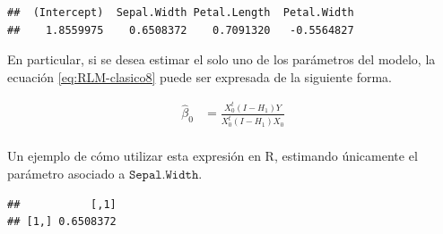 \documentclass[
  11pt,
]{book}
\newenvironment{Shaded}{\begin{snugshade}}{\end{snugshade}}
\newcommand{\AttributeTok}[1]{\textcolor[rgb]{0.13,0.29,0.53}{#1}}
\newcommand{\CommentTok}[1]{\textcolor[rgb]{0.56,0.35,0.01}{\textit{#1}}}
\newcommand{\DecValTok}[1]{\textcolor[rgb]{0.00,0.00,0.81}{#1}}
\newcommand{\FunctionTok}[1]{\textcolor[rgb]{0.13,0.29,0.53}{\textbf{#1}}}
\newcommand{\NormalTok}[1]{#1}
\newcommand{\OtherTok}[1]{\textcolor[rgb]{0.56,0.35,0.01}{#1}}
\newcommand{\SpecialCharTok}[1]{\textcolor[rgb]{0.81,0.36,0.00}{\textbf{#1}}}
\theoremstyle{definition}
\theoremstyle{definition}
\theoremstyle{definition}
\theoremstyle{definition}
\theoremstyle{remark}
\begin{document}
\begin{verbatim}
##  (Intercept)  Sepal.Width Petal.Length  Petal.Width 
##    1.8559975    0.6508372    0.7091320   -0.5564827
\end{verbatim}

En particular, si se desea estimar el solo uno de los parámetros del modelo, la ecuación \eqref{eq:RLM-clasico8} puede ser expresada de la siguiente forma.

\begin{equation}
\begin{split}
\widehat{\beta}_0 &= \frac{X^t_0(I-H_1)Y}{X^t_0(I-H_1)X_0}\\
\end{split}
\label{eq:RLM-clasico9}
\end{equation}

Un ejemplo de cómo utilizar esta expresión en R, estimando únicamente el parámetro asociado a \(\texttt{Sepal.Width}\).

\begin{Shaded}
\end{Shaded}

\begin{verbatim}
##           [,1]
## [1,] 0.6508372
\end{verbatim}
\end{document}
